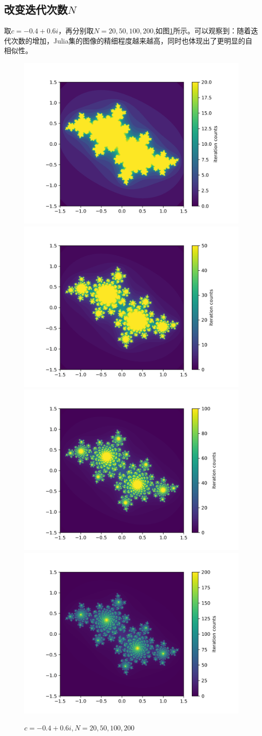 \documentclass[a4paper]{ctexart}
\begin{document}
\subsection{改变迭代次数$N$}
取$c=-0.4+0.6i$\cite{julia_wiki}，再分别取$N=20,50,100,200$,如图\ref{tu2}所示。可以观察到：随着迭代次数的增加，Julia集的图像的精细程度越来越高，同时也体现出了更明显的自相似性。
\begin{figure}[H]
	\centering
	\includegraphics[width=.45\textwidth]{./png/300dpi/julia_cx-0.4cy0.6_N20.png}
	\includegraphics[width=.45\textwidth]{./png/300dpi/julia_cx-0.4cy0.6_N50.png}
	\includegraphics[width=.45\textwidth]{./png/300dpi/julia_cx-0.4cy0.6_N100.png}
	\includegraphics[width=.45\textwidth]{./png/300dpi/julia_cx-0.4cy0.6_N200.png}
	\caption{$c=-0.4+0.6i,N=20,50,100,200$}
	\label{tu2}
\end{figure}
\end{document}
